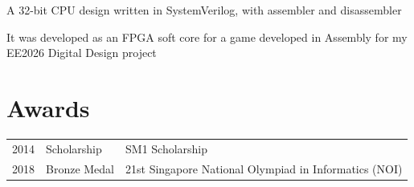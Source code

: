 \documentclass[]{deedy-resume-openfont}
\begin{document}
\begin{minipage}[t]{0.66\textwidth}
\vspace{\topsep} %
\begin{tightemize}
\item A 32-bit CPU design written in SystemVerilog, with assembler and disassembler
\item It was developed as an FPGA soft core for a game developed in Assembly for my EE2026 Digital Design project
\end{tightemize}
\sectionsep
\sectionsep
\sectionsep
\sectionsep


\section{Awards}
\begin{tabular}{rll}
2014      & Scholarship  & SM1 Scholarship \\
2018      & Bronze Medal  & 21st Singapore National Olympiad in Informatics (NOI) \\
\end{tabular}
\sectionsep

\end{minipage}
\end{document}
